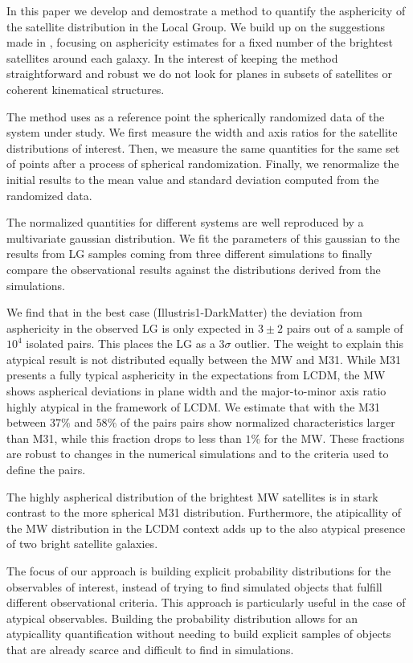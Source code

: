\documentclass[a4paper,fleqn,usenatbib]{mnras}
\begin{document}
In this paper we develop and demostrate a method to quantify the
asphericity of the satellite distribution in the Local Group.
We build up on the suggestions made in \cite{2017AN....338..854P}, 
focusing on asphericity estimates for a fixed number of the brightest
satellites around each galaxy.
In the interest of keeping the method straightforward and robust we do
not look for planes in subsets of satellites or coherent kinematical
structures. 

The method uses as a reference point the spherically randomized data
of the system under study.
We first measure the width and axis ratios for the satellite
distributions of interest. 
Then, we measure the same quantities for the same set of points after
a process of spherical randomization.
Finally, we renormalize the initial results to the mean value and
standard deviation computed from the randomized data.  


The normalized quantities for different systems are well reproduced by
a multivariate gaussian distribution. 
We fit the parameters of this gaussian to the results from 
LG samples coming from three different simulations
to finally compare the observational results against the distributions
derived from the simulations.

We find that in the best case (Illustris1-DarkMatter) the deviation
from asphericity in the observed LG is only expected in $3\pm2$
pairs out of a sample of $10^4$ isolated pairs. This places the LG as
a $3\sigma$ outlier.   
The weight to explain this atypical result is not distributed equally
between the MW and M31. 
While M31 presents a fully typical asphericity in the expectations
from LCDM, the MW shows aspherical deviations in plane width and the
major-to-minor axis ratio highly atypical in the 
framework of LCDM. 
We estimate that with the M31 between $37\%$ and $58\%$ of the pairs
pairs show normalized characteristics larger than M31, while
this fraction drops to less than $1\%$ for the MW.
These fractions are robust to changes in the numerical simulations and to
the criteria used to define the pairs.


The highly aspherical distribution of the brightest MW satellites is
in stark contrast to the more spherical M31 distribution.
Furthermore, the atipicallity of the MW distribution in the LCDM
context adds up to the also atypical presence of two bright satellite
galaxies.


The focus of our approach is building explicit probability
distributions for the observables of interest, instead of trying to
find simulated objects that fulfill different observational criteria. 
This approach is particularly useful in the case of atypical
observables. 
Building the probability distribution allows for an atypicallity
quantification without needing to build explicit samples of objects
that are already scarce and difficult to find in simulations.
\end{document}
